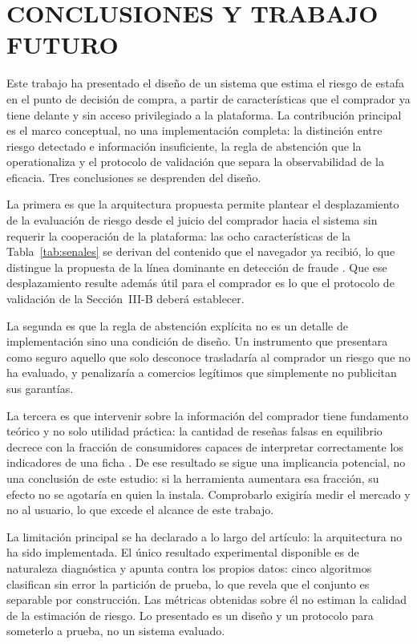 
\section{CONCLUSIONES Y TRABAJO FUTURO}

Este trabajo ha presentado el diseño de un sistema que estima el riesgo de estafa en el punto
de decisión de compra, a partir de características que el comprador ya tiene delante y sin
acceso privilegiado a la plataforma. La contribución principal es el marco conceptual, no una
implementación completa: la distinción entre riesgo detectado e información insuficiente, la
regla de abstención que la operationaliza y el protocolo de validación que separa la
observabilidad de la eficacia. Tres conclusiones se desprenden del diseño.

La primera es que la arquitectura propuesta permite plantear el desplazamiento de la
evaluación de riesgo desde el juicio del comprador hacia el sistema sin requerir la
cooperación de la plataforma: las ocho características de la Tabla~\ref{tab:senales} se
derivan del contenido que el navegador ya recibió, lo que distingue la propuesta de la línea
dominante en detección de fraude \cite{ref28}. Que ese desplazamiento resulte además útil para
el comprador es lo que el protocolo de validación de la Sección~III-B deberá establecer.

La segunda es que la regla de abstención explícita no es un detalle de implementación sino
una condición de diseño. Un instrumento que presentara como seguro aquello que solo desconoce
trasladaría al comprador un riesgo que no ha evaluado, y penalizaría a comercios legítimos
que simplemente no publicitan sus garantías.

La tercera es que intervenir sobre la información del comprador tiene fundamento teórico y no
solo utilidad práctica: la cantidad de reseñas falsas en equilibrio decrece con la fracción de
consumidores capaces de interpretar correctamente los indicadores de una ficha \cite{ref29}.
De ese resultado se sigue una implicancia potencial, no una conclusión de este estudio: si la
herramienta aumentara esa fracción, su efecto no se agotaría en quien la instala. Comprobarlo
exigiría medir el mercado y no al usuario, lo que excede el alcance de este trabajo.

La limitación principal se ha declarado a lo largo del artículo: la arquitectura no ha sido
implementada. El único resultado experimental disponible es de naturaleza diagnóstica y apunta
contra los propios datos: cinco algoritmos clasifican sin error la partición de prueba, lo que
revela que el conjunto es separable por construcción. Las métricas obtenidas sobre él no
estiman la calidad de la estimación de riesgo. Lo presentado es un diseño y un protocolo para
someterlo a prueba, no un sistema evaluado.

